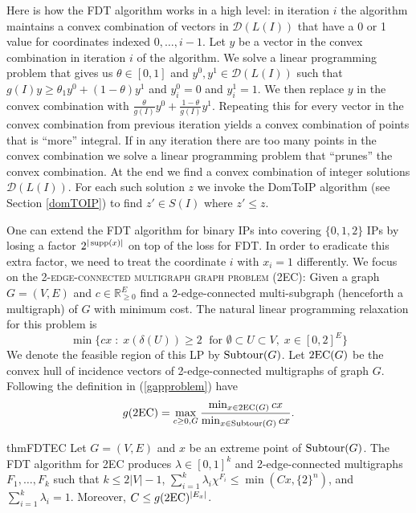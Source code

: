 Here is how the FDT algorithm works in a high level: in iteration $i$ the algorithm maintains a convex combination of  vectors in $\mathcal{D}(L(I))$ that have a 0 or 1 value for coordinates indexed $0,\ldots,i-1$. Let $y$ be a vector in the convex combination in iteration $i$ of the algorithm. We solve a linear programming problem that gives us $\theta\in [0,1]$ and $y^0,y^1\in \mathcal{D}(L(I))$ such that $g(I) y\geq \theta_1y^0 + (1-\theta) y^1$ and $y^0_i=0$ and $y^1_i=1$. We then replace $y$ in the convex combination with $\frac{\theta}{g(I)}y^0 +\frac{1-\theta}{g(I)}y^1$. Repeating this for every vector in the convex combination from previous iteration yields a convex combination  of points that is ``more'' integral. If in any iteration there are too many points in the convex combination we solve a linear programming problem that ``prunes'' the convex combination. At the end we find a convex combination of integer solutions $\mathcal{D}(L(I))$. For each such solution $z$ we invoke the DomToIP algorithm (see Section \ref{domTOIP}) to find $z'\in S(I)$ where $z'\leq z$.


One can extend the FDT algorithm for binary IPs into covering $\{0,1,2\}$ IPs by losing a factor $2^{|\operatorname{supp}(x)|}$ on top of the loss for FDT. In order to eradicate this extra factor, we need to treat the coordinate $i$ with $x_i=1$ differently. We focus on the \textsc{2-edge-connected multigraph graph problem (2EC)}: Given a graph $G=(V,E)$ and $c\in \mathbb{R}^{E}_{\geq 0}$ find a 2-edge-connected multi-subgraph (henceforth a multigraph) of $G$ with minimum cost. The natural linear programming relaxation for this problem is 
\begin{equation}
\min \{cx \; : \; x(\delta(U))\geq 2 \; \text{ for }\emptyset \subset U \subset V, \; x\in [0,2]^E\}
\end{equation}
We denote the feasible region of this LP by $\operatorname{{Subtour}}(G)$. Let $\2ec(G)$ be the convex hull of incidence vectors of 2-edge-connected multigraphs of graph $G$. Following the definition in (\ref{gapproblem}) have
\begin{equation}
g(\2ec) = \max_{c\geq 0 , G}\frac{\min_{x\in \2ec(G)} cx}{\min_{x\in \subtour(G)} cx}.
\end{equation}

\begin{restatable}{thm}{FDTEC}
	\label{FDT2EC}
	Let $G=(V,E)$ and $x$ be an extreme point of  $\operatorname{{Subtour}}(G)$. The FDT algorithm for 2EC produces $\lambda\in [0,1]^k$ and 2-edge-connected multigraphs $F_1,\ldots,F_k$ such that $k\leq 2|V|-1$, $\sum_{i=1}^{k}\lambda_i \chi^{F_i}\leq \min(Cx,\{2\}^n)$, and $\sum_{i=1}^{k}\lambda_i = 1$. Moreover, $C\leq g(\2ec)^{|E_x|}$.
\end{restatable}

